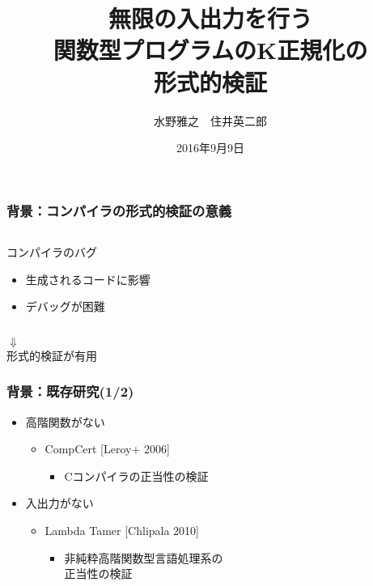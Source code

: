 \documentclass[t,dvipdfmx,cjk,xcolor=dvipsnames,envcountsect,notheorems,12pt]{beamer}
\title{\alert<2>{無限の入出力}を行う\\\alert<2>{関数型プログラム}のK正規化の\\形式的検証}
\author{水野雅之　住井英二郎}
\institute[東北大学　住井・松田研]{東北大学 大学院情報科学研究科}%
\date{2016年9月9日}
\theoremstyle{definition}
\begin{document}
\frame[plain]{\titlepage}%

\begin{frame}
	\frametitle{背景：コンパイラの形式的検証の意義}
	\begin{center}
		\LARGE 
		\begin{columns}
			\begin{column}{0.8\textwidth}
				\begin{itembox}[c]{\Large コンパイラのバグ}
					\begin{itemize}
						\item 生成されるコードに影響
						\item デバッグが困難
					\end{itemize}
				\end{itembox}
			\end{column}
		\end{columns}
		$\Downarrow$\\
		形式的検証が有用
	\end{center}
\end{frame}

\begin{frame}
	\frametitle{背景：既存研究(1/2)}
	\begin{itemize}
		\item 高階関数がない
			\begin{itemize}
				\item CompCert [Leroy+ 2006]
					\begin{itemize}
						\item Cコンパイラの正当性の検証
					\end{itemize}
			\end{itemize}
		\item 入出力がない
			\begin{itemize}
				\item Lambda Tamer [Chlipala 2010]
					\begin{itemize}
						\item 非純粋高階関数型言語処理系の\\正当性の検証
					\end{itemize}
			\end{itemize}
	\end{itemize}
\end{frame}
\end{document}
